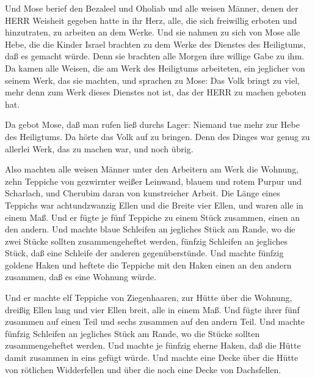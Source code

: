  Und Mose berief den Bezaleel und Oholiab und alle weisen
Männer, denen der HERR Weisheit gegeben hatte in ihr Herz, alle, die
sich freiwillig erboten und hinzutraten, zu arbeiten an dem Werke.
 Und sie nahmen zu sich von Mose alle Hebe, die die Kinder
Israel brachten zu dem Werke des Dienstes des Heiligtums, daß es gemacht
würde. Denn sie brachten alle Morgen ihre willige Gabe zu ihm.
 Da kamen alle Weisen, die am Werk des Heiligtums
arbeiteten, ein jeglicher von seinem Werk, das sie machten, 
und sprachen zu Mose: Das Volk bringt zu viel, mehr denn zum Werk dieses
Dienstes not ist, das der HERR zu machen geboten hat.

 Da gebot Mose, daß man rufen ließ durchs Lager: Niemand tue
mehr zur Hebe des Heiligtums. Da hörte das Volk auf zu bringen.
 Denn des Dinges war genug zu allerlei Werk, das zu machen
war, und noch übrig.

 Also machten alle weisen Männer unter den Arbeitern am Werk
die Wohnung, zehn Teppiche von gezwirnter weißer Leinwand, blauem und
rotem Purpur und Scharlach, und Cherubim daran von kunstreicher Arbeit.
 Die Länge eines Teppichs war achtundzwanzig Ellen und die
Breite vier Ellen, und waren alle in einem Maß.  Und er
fügte je fünf Teppiche zu einem Stück zusammen, einen an den andern.
 Und machte blaue Schleifen an jegliches Stück am Rande, wo
die zwei Stücke sollten zusammengeheftet werden,  fünfzig
Schleifen an jegliches Stück, daß eine Schleife der anderen
gegenüberstünde.  Und machte fünfzig goldene Haken und
heftete die Teppiche mit den Haken einen an den andern zusammen, daß es
eine Wohnung würde.

 Und er machte elf Teppiche von Ziegenhaaren, zur Hütte
über die Wohnung,  dreißig Ellen lang und vier Ellen breit,
alle in einem Maß.  Und fügte ihrer fünf zusammen auf einen
Teil und sechs zusammen auf den andern Teil.  Und machte
fünfzig Schleifen an jegliches Stück am Rande, wo die Stücke sollten
zusammengeheftet werden.  Und machte je fünfzig eherne
Haken, daß die Hütte damit zusammen in eins gefügt würde. 
Und machte eine Decke über die Hütte von rötlichen Widderfellen und über
die noch eine Decke von Dachsfellen.

